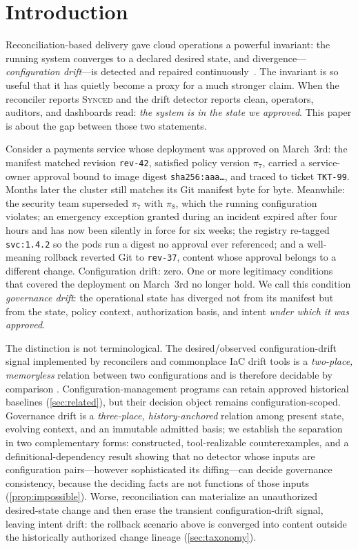 \section{Introduction}
\label{sec:intro}

Reconciliation-based delivery gave cloud operations a powerful invariant:
the running system converges to a declared desired state, and divergence---%
\emph{configuration drift}---is detected and repaired
continuously~\cite{opengitops,beetz2022,argocd,fluxcd,burns2016}. The invariant
is so useful that it has quietly become a proxy for a much stronger claim. When
the reconciler reports \textsc{Synced} and the drift detector reports clean,
operators, auditors, and dashboards read: \emph{the system is in the state we
approved}. This paper is about the gap between those two statements.

Consider a payments service whose deployment was approved on March~3rd: the
manifest matched revision \texttt{rev-42}, satisfied policy version
$\pi_7$, carried a service-owner approval bound to image digest
\texttt{sha256:aaa\ldots}, and traced to ticket \texttt{TKT-99}. Months later
the cluster still matches its Git manifest byte for byte. Meanwhile: the
security team superseded $\pi_7$ with $\pi_8$, which the running configuration
violates; an emergency exception granted during an incident expired
after four hours and has now been silently in force for six weeks; the registry
re-tagged \texttt{svc:1.4.2} so the pods run a digest no approval ever
referenced; and a well-meaning rollback reverted Git to \texttt{rev-37},
content whose approval belongs to a different change. Configuration drift:
zero. One or more legitimacy conditions that covered the deployment on
March~3rd no longer hold. We call this condition \emph{governance drift}: the
operational state has diverged not from its manifest but from the state,
policy context, authorization basis, and intent \emph{under which it was
approved}.

The distinction is not terminological. The desired/observed
configuration-drift signal implemented by reconcilers and commonplace IaC
drift tools is a \emph{two-place, memoryless} relation between two
configurations and is therefore decidable by comparison
\cite{awsconfig,driftctl}. Configuration-management programs can retain
approved historical baselines (\cref{sec:related}), but their decision object
remains configuration-scoped. Governance drift is a
\emph{three-place, history-anchored} relation among present state, evolving
context, and an immutable admitted basis; we establish the separation in two complementary
forms: constructed, tool-realizable counterexamples, and a
definitional-dependency result showing that no detector whose inputs are
configuration pairs---however sophisticated its diffing---can decide
governance consistency, because the deciding facts are not functions of those
inputs (\cref{prop:impossible}). Worse, reconciliation can materialize an
unauthorized desired-state change and then erase the transient
configuration-drift signal, leaving intent drift: the rollback scenario above
is converged into content outside the historically authorized change lineage
(\cref{sec:taxonomy}).

